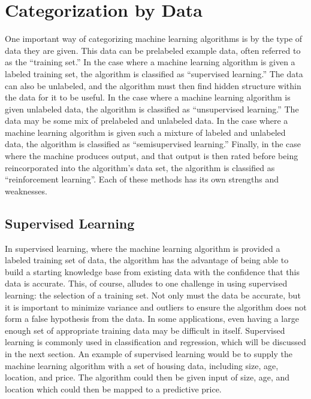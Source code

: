 
\section{Categorization by Data} %

One important way of categorizing machine learning algorithms is by the type of data they are given. This data can be prelabeled example data, often referred to as the ``training set.'' In the case where a machine learning algorithm is given a labeled training set, the algorithm is classified as ``supervised learning.'' The data can also be unlabeled, and the algorithm must then find hidden structure within the data for it to be useful. In the case where a machine learning algorithm is given unlabeled data, the algorithm is classified as ``unsupervised learning.'' The data may be some mix of prelabeled and unlabeled data. In the case where a machine learning algorithm is given such a mixture of labeled and unlabeled data, the algorithm is classified as ``semisupervised learning.'' Finally, in the case where the machine produces output, and that output is then rated before being reincorporated into the algorithm's data set, the algorithm is classified as ``reinforcement learning''. Each of these methods has its own strengths and weaknesses.


\subsection{Supervised Learning} %

In supervised learning, where the machine learning algorithm is provided a labeled training set of data, the algorithm has the advantage of being able to build a starting knowledge base from existing data with the confidence that this data is accurate. This, of course, alludes to one challenge in using supervised learning: the selection of a training set. Not only must the data be accurate, but it is important to minimize variance and outliers to ensure the algorithm does not form a false hypothesis from the data. In some applications, even having a large enough set of appropriate training data may be difficult in itself. Supervised learning is commonly used in classification and regression, which will be discussed in the next section. An example of supervised learning would be to supply the machine learning algorithm with a set of housing data, including size, age, location, and price. The algorithm could then be given input of size, age, and location which could then be mapped to a predictive price. \cite{website:ng}

